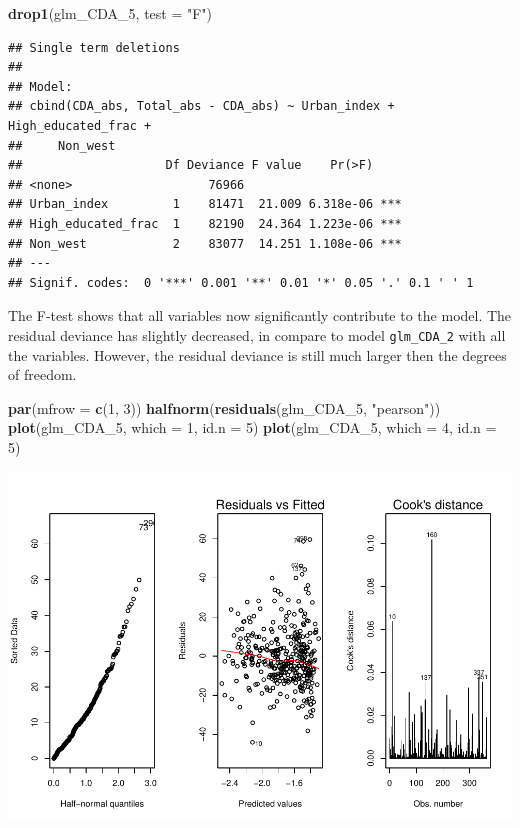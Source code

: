 \documentclass[11pt,]{article}
\newenvironment{Shaded}{\begin{snugshade}}{\end{snugshade}}
\newcommand{\KeywordTok}[1]{\textcolor[rgb]{0.13,0.29,0.53}{\textbf{#1}}}
\newcommand{\DataTypeTok}[1]{\textcolor[rgb]{0.13,0.29,0.53}{#1}}
\newcommand{\DecValTok}[1]{\textcolor[rgb]{0.00,0.00,0.81}{#1}}
\newcommand{\StringTok}[1]{\textcolor[rgb]{0.31,0.60,0.02}{#1}}
\newcommand{\NormalTok}[1]{#1}
\begin{document}
\begin{Shaded}
\begin{Highlighting}[]
\KeywordTok{drop1}\NormalTok{(glm_CDA_}\DecValTok{5}\NormalTok{, }\DataTypeTok{test =} \StringTok{"F"}\NormalTok{)}
\end{Highlighting}
\end{Shaded}

\begin{verbatim}
## Single term deletions
## 
## Model:
## cbind(CDA_abs, Total_abs - CDA_abs) ~ Urban_index + High_educated_frac + 
##     Non_west
##                    Df Deviance F value    Pr(>F)    
## <none>                   76966                      
## Urban_index         1    81471  21.009 6.318e-06 ***
## High_educated_frac  1    82190  24.364 1.223e-06 ***
## Non_west            2    83077  14.251 1.108e-06 ***
## ---
## Signif. codes:  0 '***' 0.001 '**' 0.01 '*' 0.05 '.' 0.1 ' ' 1
\end{verbatim}

The F-test shows that all variables now significantly contribute to the
model. The residual deviance has slightly decreased, in compare to model
\texttt{glm\_CDA\_2} with all the variables. However, the residual
deviance is still much larger then the degrees of freedom.

\begin{Shaded}
\begin{Highlighting}[]
\KeywordTok{par}\NormalTok{(}\DataTypeTok{mfrow =} \KeywordTok{c}\NormalTok{(}\DecValTok{1}\NormalTok{, }\DecValTok{3}\NormalTok{))}
\KeywordTok{halfnorm}\NormalTok{(}\KeywordTok{residuals}\NormalTok{(glm_CDA_}\DecValTok{5}\NormalTok{, }\StringTok{"pearson"}\NormalTok{))}
\KeywordTok{plot}\NormalTok{(glm_CDA_}\DecValTok{5}\NormalTok{, }\DataTypeTok{which =} \DecValTok{1}\NormalTok{, }\DataTypeTok{id.n =} \DecValTok{5}\NormalTok{)}
\KeywordTok{plot}\NormalTok{(glm_CDA_}\DecValTok{5}\NormalTok{, }\DataTypeTok{which =} \DecValTok{4}\NormalTok{, }\DataTypeTok{id.n =} \DecValTok{5}\NormalTok{)}
\end{Highlighting}
\end{Shaded}

\begin{center}\includegraphics{Report_files/figure-latex/unnamed-chunk-25-1} \end{center}
\end{document}
